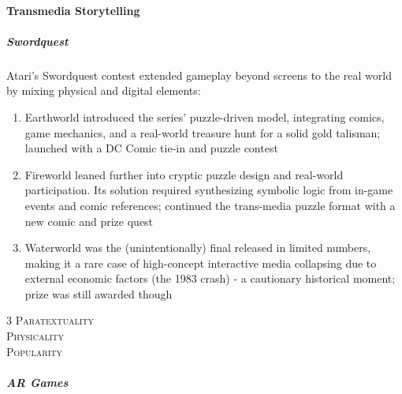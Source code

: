 \documentclass[12pt]{article}
\begin{document}
\paragraph{Transmedia Storytelling}
\subparagraph{Swordquest}
Atari's Swordquest contest extended gameplay beyond screens to the real world by mixing physical and digital elements:
    \begin{enumerate}
        \item Earthworld \parencite*{swordquest_earthworld1982} introduced the series' puzzle-driven model, integrating comics, game mechanics, and a real-world treasure hunt for a solid gold talisman; launched with a DC Comic tie-in and puzzle contest
        \item Fireworld \parencite*{swordquest_fireworld1983} leaned further into cryptic puzzle design and real-world participation. Its solution required synthesizing symbolic logic from in-game events and comic references; continued the trans-media puzzle format with a new comic and prize quest
        \item Waterworld \parencite*{swordquest_waterworld1983} was the (unintentionally) final released in limited numbers, making it a rare case of high-concept interactive media collapsing due to external economic factors (the 1983 crash) - a cautionary historical moment; prize was still awarded though
    \end{enumerate}
\begin{multicols}{3}
    \textsc{Paratextuality}\phantom{.}\\  \columnbreak
    \textsc{Physicality}\phantom{.}\\  \columnbreak
    \textsc{Popularity}\phantom{.}\\ 
\end{multicols}
\subparagraph{AR Games}\cite{sicart-argo}
\end{document}
